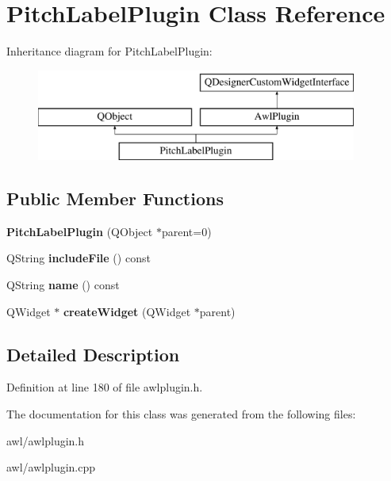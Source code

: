 \hypertarget{class_pitch_label_plugin}{}\section{Pitch\+Label\+Plugin Class Reference}
\label{class_pitch_label_plugin}
Inheritance diagram for Pitch\+Label\+Plugin\+:\begin{figure}[H]
\begin{center}
\leavevmode
\includegraphics[height=3.000000cm]{class_pitch_label_plugin}
\end{center}
\end{figure}
\subsection*{Public Member Functions}
\begin{DoxyCompactItemize}
\item 
\mbox{\label{class_pitch_label_plugin_a4de3f51ef9800dd0c185f0f50c761afa}} 
{\bfseries Pitch\+Label\+Plugin} (Q\+Object $\ast$parent=0)
\item 
\mbox{\label{class_pitch_label_plugin_a12067764735857d29424e945bc193190}} 
Q\+String {\bfseries include\+File} () const
\item 
\mbox{\label{class_pitch_label_plugin_af1afcb4163113763fe2b9c8f9b87459d}} 
Q\+String {\bfseries name} () const
\item 
\mbox{\label{class_pitch_label_plugin_a8a418e424542f3800776e4a7b6a5b924}} 
Q\+Widget $\ast$ {\bfseries create\+Widget} (Q\+Widget $\ast$parent)
\end{DoxyCompactItemize}


\subsection{Detailed Description}


Definition at line 180 of file awlplugin.\+h.



The documentation for this class was generated from the following files\+:\begin{DoxyCompactItemize}
\item 
awl/awlplugin.\+h\item 
awl/awlplugin.\+cpp\end{DoxyCompactItemize}
